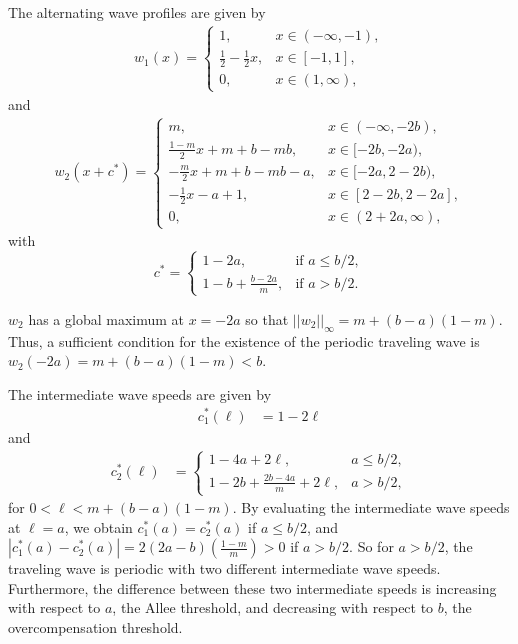 \documentclass[11pt]{article}
\theoremstyle{definition}
\numberwithin{equation}{section}
\numberwithin{thm}{section}
\renewcommand{\a}{a}
\renewcommand{\b}{b}
\newcommand{\m}{m}
\begin{document}
The alternating wave profiles are given by
\begin{equation} \label{uniformw1}
\begin{aligned}
w_1(x) 
= \begin{cases}
1, & x \in (-\infty, -1), \\
\frac{1}{2}-\frac{1}{2}x, & x \in [-1, 1] ,\\
0, & x \in (1, \infty),
\end{cases}
\end{aligned} \end{equation}
and 
\begin{equation} \label{uniformw2}
\begin{aligned}
w_2(x+c^*)
= \begin{cases}
m,
& x \in (-\infty, -2\b), \\
\frac{1-m}{2}x + m + b - mb,
& x \in [-2\b, 
 -2\a), \\
-\frac{m}{2}x +m+b- mb-a,
& x \in [-2\a, 2-2\b), \\
-\frac{1}{2} x-a+1,
& x \in [2-2\b, 2-2\a], \\
0,
& x \in (2+2\a,\infty),
\end{cases}
\end{aligned} \end{equation}
with
\begin{equation} \label{clinear}
c^* = \begin{cases}
1 - 2a, & \text{if } a \leq b/2, \\
1 -b + \frac{b - 2a}{m}, & \text{if }a > b/2.
\end{cases}
\end{equation}

$w_2$ has a global maximum at $x=-2\a$ so that $||w_2||_\infty=m+(b-a)(1-m)$.
Thus, a sufficient condition for the existence of the periodic traveling wave is $w_2(-2\a)=m+(b-a)(1-m) < \b$.

The intermediate wave speeds are given by
\begin{equation} \begin{aligned}
c_1^*(\ell) 
&= 1-2\ell
\end{aligned}
\end{equation}
and
\begin{equation} \begin{aligned}
c_2^*(\ell) 
&= \begin{cases}
1 - 4a + 2\ell, & a \leq b/2, \\
1 - 2b + \frac{2b-4a}{m} + 2\ell, & a > b/2 ,
\end{cases}
\end{aligned} \end{equation}
for $0 < \ell < m + (b-a)(1-m)$.
By evaluating the intermediate wave speeds at $\ell=\a$, we obtain $c_1^*(\a)=c_2^*(\a)$ if $\a \leq \b/2$, and $|c_1^*(\a)-c_2^*(\a)|=2(2\a-\b)(\frac{1-\m}{\m})>0$ if $a>b/2$.
So for $a>b/2$, the traveling wave is periodic with two different intermediate wave speeds.
Furthermore, the difference between these two intermediate speeds is increasing with respect to $a$, the Allee threshold, and decreasing with respect to $\b$, the overcompensation threshold.
\end{document}
